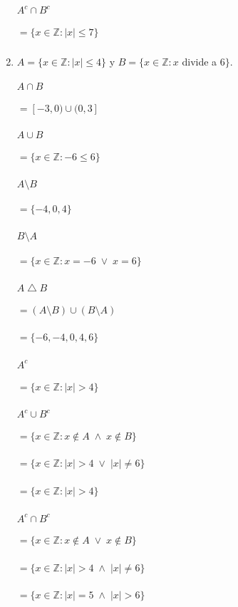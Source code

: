\begin{enumerate}
\paragraph{$A^c \cap B^c$}
	\subparagraph{$ = \{x \in \mathbb{Z} : |x| \leq 7\}$}
\renewcommand{\labelenumi}{(\alph{enumi})} \item $A = \{x \in \mathbb{Z} : |x| \leq 4\}$ y $B = \{x \in \mathbb{Z} : x$ divide a  $6\}$.
\paragraph{$A \cap B$}
	 \subparagraph{$= [-3,0) \cup (0,3]$}
\paragraph{$A \cup B$}
	\subparagraph{$= \{x \in \mathbb{Z} : -6 \leq 6\}$}
\paragraph{$A \setminus B$}
	\subparagraph{$= \{-4,0,4\}$}\newpage
\paragraph{$B \setminus A$}
	\subparagraph{$= \{x \in \mathbb{Z} : x=-6 \; \vee \; x=6\}$}
\paragraph{$A \bigtriangleup B$}
	\subparagraph{$= (A \setminus B) \cup (B \setminus A)$}
	\subparagraph{$= \{-6,-4,0,4,6\}$}
\paragraph{$A^c$}
	\subparagraph{$= \{x \in \mathbb{Z} : |x|>4\}$}
\paragraph{$A^c \cup B^c$}
	\subparagraph{$= \{x \in \mathbb{Z} : x \notin A \; \wedge \; x \notin B\}$}
	\subparagraph{$= \{x \in \mathbb{Z} : |x|>4 \; \vee \; |x| \neq 6\}$}
	\subparagraph{$= \{x \in \mathbb{Z} : |x|>4\}$}
\paragraph{$A^c \cap B^c$}
	\subparagraph{$= \{x \in \mathbb{Z} : x \notin A \; \vee \; x \notin B\}$}
	\subparagraph{$= \{x \in \mathbb{Z} : |x|>4 \; \wedge \; |x| \neq 6\}$}
	\subparagraph{$= \{x \in \mathbb{Z} : |x|=5 \; \wedge \; |x| > 6\}$}
	
\end{enumerate}